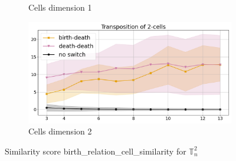 \documentclass{article}
\begin{document}
\begin{figure}[htbp]
\begin{subfigure}[b]{0.3\textwidth}
    \caption{Cells dimension 1}
    \label{fig:birthrelationcellsimilaritycomplex2cells1}
\end{subfigure}
\hfill
\begin{subfigure}[b]{0.3\textwidth}
    \includegraphics[width=\linewidth]{pics/torus-transpositions-extended/score-birth-relation-cell-similarity-complex-dim2-transpositions-dim2.png}
    \caption{Cells dimension 2}
    \label{fig:birthrelationcellsimilaritycomplex2cells2}
\end{subfigure}
\caption{Similarity score birth\_relation\_cell\_similarity for $\mathbb{T}_n^{2}$}
\label{fig:birthrelationcellsimilaritycomplex2}
\end{figure}
\end{document}

